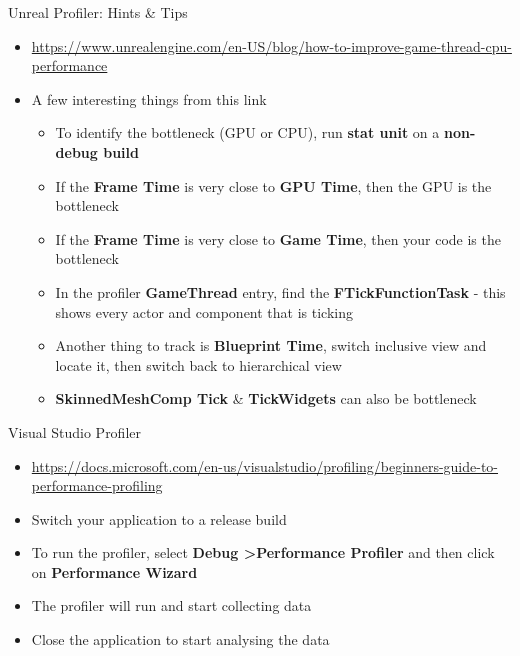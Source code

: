 \begin{frame}{Unreal Profiler: Hints \& Tips}
\begin{itemize}
	\pause \item \url{https://www.unrealengine.com/en-US/blog/how-to-improve-game-thread-cpu-performance}
	\pause \item A few interesting things from this link
	\begin{itemize}
		\pause \item To identify the bottleneck (GPU or CPU), run \textbf{stat unit} on a \textbf{non-debug build}
		\pause \item If the \textbf{Frame Time} is very close to \textbf{GPU Time}, then the GPU is the bottleneck
		\pause \item If the \textbf{Frame Time} is very close to \textbf{Game Time}, then your code is the bottleneck
		\pause \item In the profiler \textbf{GameThread} entry, find the \textbf{FTickFunctionTask} - this shows every actor and component that is ticking
		\pause \item Another thing to track is \textbf{Blueprint Time}, switch inclusive view and locate it, then switch back to hierarchical view
		\pause \item \textbf{SkinnedMeshComp Tick} \& \textbf{TickWidgets} can also be bottleneck
	\end{itemize}
\end{itemize}
\end{frame}

\begin{frame}{ Visual Studio Profiler}
\begin{itemize}
	\pause \item \url{https://docs.microsoft.com/en-us/visualstudio/profiling/beginners-guide-to-performance-profiling}
	\pause \item Switch your application to a release build
	\pause \item To run the profiler, select \textbf{Debug \textgreater Performance Profiler} and then click on \textbf{Performance Wizard}
	\pause \item The profiler will run and start collecting data
	\pause \item Close the application to start analysing the data
\end{itemize}
\end{frame}



